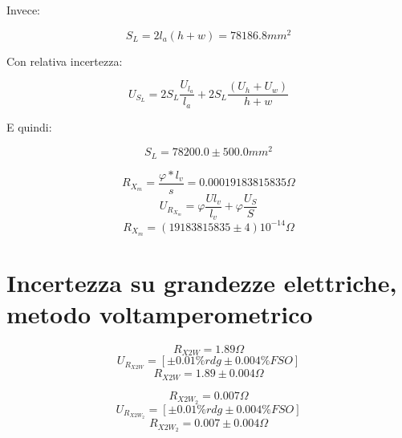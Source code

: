 \documentclass[a4paper]{article}
\begin{document}
Invece:
\begin{Large} 
	\begin{equation}
		S_L= 2l_a(h+w) = 78186.8 mm^2
	 \end{equation}
\end{Large}
Con relativa incertezza:
\begin{Large} 
	\begin{equation}
		U_{S_L} =2S_L\frac{U_{l_a}}{l_a}+2S_L\frac{(U_h+U_w)}{h+w}
	 \end{equation}
\end{Large}
E quindi: 
\begin{Large} 
	\begin{equation}
		S_L =78200.0\pm 500.0mm^2
	 \end{equation}
\end{Large}

\begin{Large}
	\begin{equation}
		R_{X_{m}} =\frac{\varphi*l_v}{s}= 0.00019183815835 \Omega
	 \end{equation}
	\begin{equation}
		U_{R_{X_{m}}} = \varphi\frac{U{l_v}}{l_v}+\varphi\frac{U_{S}}{S}
	 \end{equation}
	 \begin{equation}
		R_{X_{m}} = (19183815835 \pm 4)10^{-14} \Omega
	 \end{equation}
\end{Large}

\section {Incertezza su grandezze elettriche, metodo voltamperometrico}

\begin{Large}
	\begin{equation}
		R_{X2W}= 1.89 \Omega
	\end{equation}
	\begin{equation}
		U_{R_{X2W}} = [\pm 0.01\%rdg \pm 0.004\% FSO]
	 \end{equation}
	 \begin{equation}
		R_{X2W} = 1.89 \pm 0.004 \Omega
	 \end{equation}
\end{Large}

\begin{Large}
	\begin{equation}
		R_{X2W_{2}} = 0.007 \Omega
	 \end{equation}
	\begin{equation}
		U_{R_{X2W_{2}}} = [\pm 0.01\%rdg \pm 0.004\% FSO]
	 \end{equation}
	 \begin{equation}
		R_{X2W_{2}} = 0.007 \pm 0.004 \Omega
	 \end{equation}
\end{Large}
\end{document}
